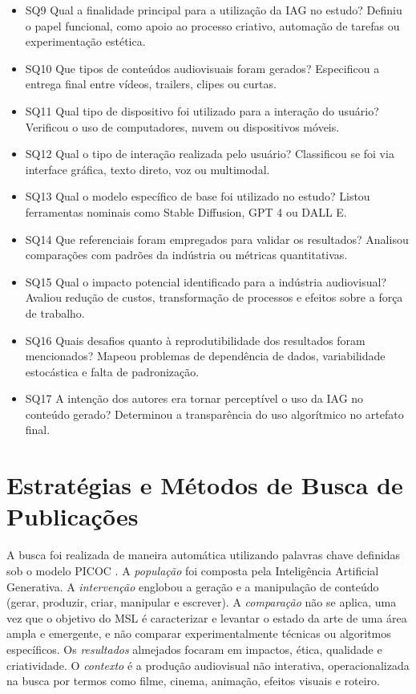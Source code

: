 \begin{itemize}
    \item SQ9 Qual a finalidade principal para a utilização da IAG no estudo? Definiu o papel funcional, como apoio ao processo criativo, automação de tarefas ou experimentação estética.
    \item SQ10 Que tipos de conteúdos audiovisuais foram gerados? Especificou a entrega final entre vídeos, trailers, clipes ou curtas.
    \item SQ11 Qual tipo de dispositivo foi utilizado para a interação do usuário? Verificou o uso de computadores, nuvem ou dispositivos móveis.
    \item SQ12 Qual o tipo de interação realizada pelo usuário? Classificou se foi via interface gráfica, texto direto, voz ou multimodal.
    \item SQ13 Qual o modelo específico de base foi utilizado no estudo? Listou ferramentas nominais como Stable Diffusion, GPT 4 ou DALL E.
    \item SQ14 Que referenciais foram empregados para validar os resultados? Analisou comparações com padrões da indústria ou métricas quantitativas.
    \item SQ15 Qual o impacto potencial identificado para a indústria audiovisual? Avaliou redução de custos, transformação de processos e efeitos sobre a força de trabalho.
    \item SQ16 Quais desafios quanto à reprodutibilidade dos resultados foram mencionados? Mapeou problemas de dependência de dados, variabilidade estocástica e falta de padronização.
    \item SQ17 A intenção dos autores era tornar perceptível o uso da IAG no conteúdo gerado? Determinou a transparência do uso algorítmico no artefato final.
\end{itemize}

\section{Estratégias e Métodos de Busca de Publicações}

A busca foi realizada de maneira automática utilizando palavras chave definidas sob o modelo PICOC \citep{Kitchenham2007SystematicReviews}. A \textit{população} foi composta pela Inteligência Artificial Generativa. A \textit{intervenção} englobou a geração e a manipulação de conteúdo (gerar, produzir, criar, manipular e escrever). A \textit{comparação} não se aplica, uma vez que o objetivo do MSL é caracterizar e levantar o estado da arte de uma área ampla e emergente, e não comparar experimentalmente técnicas ou algoritmos específicos. Os \textit{resultados} almejados focaram em impactos, ética, qualidade e criatividade. O \textit{contexto} é a produção audiovisual não interativa, operacionalizada na busca por termos como filme, cinema, animação, efeitos visuais e roteiro.

